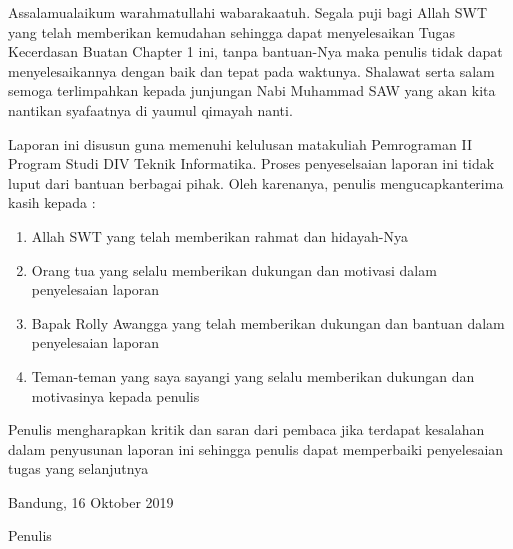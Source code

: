 \begin{acknowledgements}
Assalamualaikum warahmatullahi wabarakaatuh. Segala puji bagi Allah SWT yang telah memberikan kemudahan sehingga dapat menyelesaikan Tugas Kecerdasan Buatan Chapter 1 ini, tanpa bantuan-Nya maka penulis tidak dapat menyelesaikannya dengan baik dan tepat pada waktunya. Shalawat serta salam semoga terlimpahkan kepada junjungan Nabi Muhammad SAW yang akan kita nantikan syafaatnya di yaumul qimayah nanti.

Laporan ini disusun guna memenuhi kelulusan matakuliah Pemrograman II Program Studi DIV Teknik Informatika. Proses penyeselsaian laporan ini tidak luput dari bantuan berbagai pihak. Oleh karenanya, penulis mengucapkanterima kasih kepada :
\begin{enumerate}

\item Allah SWT yang telah memberikan rahmat dan hidayah-Nya
\item Orang tua yang selalu memberikan dukungan dan motivasi dalam penyelesaian laporan
\item Bapak Rolly Awangga yang telah memberikan dukungan dan bantuan dalam penyelesaian laporan
\item Teman-teman yang saya sayangi yang selalu memberikan dukungan dan motivasinya kepada penulis

\end{enumerate}

Penulis mengharapkan kritik dan saran dari pembaca jika terdapat kesalahan dalam penyusunan laporan ini sehingga penulis dapat memperbaiki penyelesaian tugas yang selanjutnya

\begin{raggedleft}

Bandung, 16 Oktober 2019

Penulis

\end{raggedleft}
\end{acknowledgements}